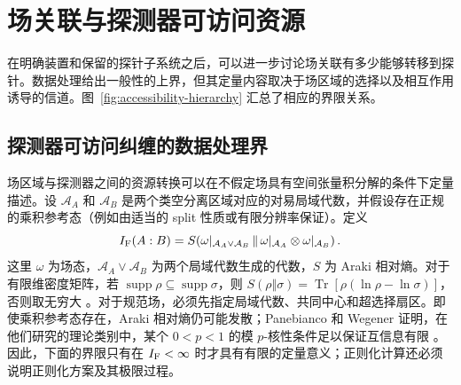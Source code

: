 \documentclass[UTF8,11pt,a4paper,fontset=none]{ctexart}
\newcommand{\Tr}{\operatorname{Tr}}
\begin{document}
\section{场关联与探测器可访问资源}
\label{sec:accessibility}
在明确装置和保留的探针子系统之后，可以进一步讨论场关联有多少能够转移到探针。数据处理给出一般性的上界，但其定量内容取决于场区域的选择以及相互作用诱导的信道。图~\ref{fig:accessibility-hierarchy} 汇总了相应的界限关系。

\subsection{探测器可访问纠缠的数据处理界}
\label{subsec:field-to-detector-bound}

场区域与探测器之间的资源转换可以在不假定场具有空间张量积分解的条件下定量描述。设 $\mathcal A_A$ 和 $\mathcal A_B$ 是两个类空分离区域对应的对易局域代数，并假设存在正规的乘积参考态（例如由适当的 split 性质或有限分辨率保证）。定义
\begin{equation}
I_{\rm F}(A:B)=
S\!\left(\omega|_{\mathcal A_A\vee\mathcal A_B}
\,\middle\|\,
\omega|_{\mathcal A_A}\otimes\omega|_{\mathcal A_B}\right).
\label{eq:field-algebra-mutual-info}
\end{equation}
这里 $\omega$ 为场态，$\mathcal A_A\vee\mathcal A_B$ 为两个局域代数生成的代数，$S$ 为 Araki 相对熵。对于有限维密度矩阵，若 $\operatorname{supp}\rho\subseteq\operatorname{supp}\sigma$，则 $S(\rho\Vert\sigma)=\Tr[\rho(\ln\rho-\ln\sigma)]$，否则取无穷大 \cite{Watrous2018}。对于规范场，必须先指定局域代数、共同中心和超选择扇区。即使乘积参考态存在，Araki 相对熵仍可能发散；Panebianco 和 Wegener 证明，在他们研究的理论类别中，某个 $0<p<1$ 的模 $p$-核性条件足以保证互信息有限 \cite{PanebiancoWegener2021}。因此，下面的界限只有在 $I_{\rm F}<\infty$ 时才具有有限的定量意义；正则化计算还必须说明正则化方案及其极限过程。
\end{document}

